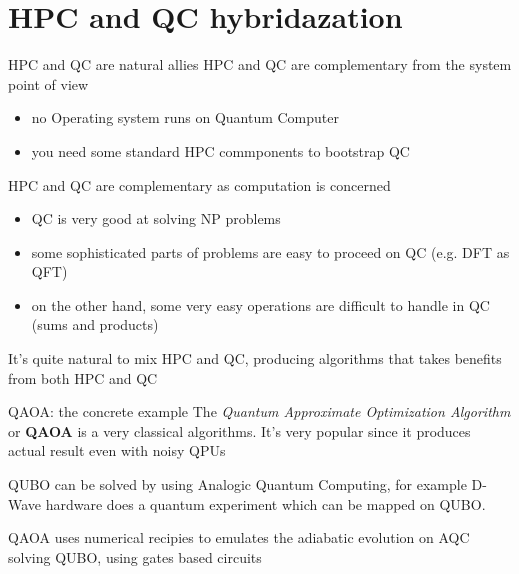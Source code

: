 \section{HPC and QC hybridazation}

\begin{frame}{HPC and QC are natural allies}
HPC and QC are complementary from the system point of view
\begin{itemize}
    \item no Operating system runs on Quantum Computer
    \item you need some standard HPC commponents to bootstrap QC
\end{itemize}
HPC and QC are complementary as computation is concerned
\begin{itemize}
    \item QC is very good at solving NP problems
    \item some sophisticated parts of problems are easy to proceed on QC (e.g. DFT as QFT)
    \item on the other hand, some very easy operations are difficult to handle in QC (sums and products)
\end{itemize}
It's quite natural to mix HPC and QC, producing algorithms that takes benefits from both HPC and QC
\end{frame}

\begin{frame}{QAOA: the concrete example}
The \textit{Quantum Approximate Optimization Algorithm} or \textbf{QAOA} is a very classical algorithms. It's very
popular since it produces actual result even with noisy QPUs
\newline

QUBO can be solved by using Analogic Quantum Computing, for example D-Wave hardware does a quantum experiment which can be 
mapped on QUBO.
\newline

QAOA uses numerical recipies to emulates the adiabatic evolution on AQC solving QUBO, using gates based circuits
\end{frame}

